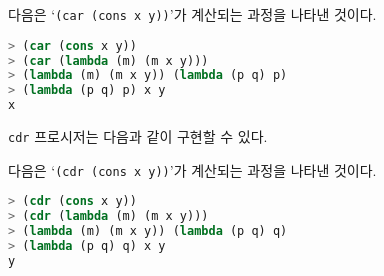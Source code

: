 

다음은 `\texttt{(car (cons x y))}'가 계산되는 과정을 나타낸 것이다.

\begin{lstlisting}[language=Scheme]
> (car (cons x y))
> (car (lambda (m) (m x y)))
> (lambda (m) (m x y)) (lambda (p q) p)
> (lambda (p q) p) x y
x
\end{lstlisting}

\texttt{cdr} 프로시저는 다음과 같이 구현할 수 있다.

다음은 `\texttt{(cdr (cons x y))}'가 계산되는 과정을 나타낸 것이다.

\begin{lstlisting}[language=Scheme]
> (cdr (cons x y))
> (cdr (lambda (m) (m x y)))
> (lambda (m) (m x y)) (lambda (p q) q)
> (lambda (p q) q) x y
y
\end{lstlisting}


